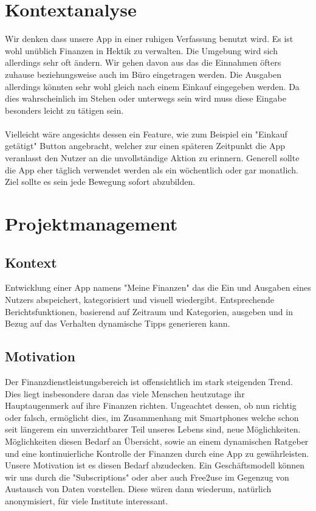 \documentclass[runningheads,a4paper]{llncs}
\begin{document}
\section{Kontextanalyse}

Wir denken dass unsere App in einer ruhigen Verfassung benutzt wird. Es ist wohl unüblich Finanzen in Hektik zu verwalten. Die Umgebung wird sich allerdings sehr oft ändern. Wir gehen davon aus das die Einnahmen öfters zuhause beziehungsweise auch im Büro eingetragen werden. Die Ausgaben allerdings könnten sehr wohl gleich nach einem Einkauf eingegeben werden. Da dies wahrscheinlich im Stehen oder unterwegs sein wird muss diese Eingabe besonders leicht zu tätigen sein. \\\\Vielleicht wäre angesichts dessen ein Feature, wie zum Beispiel ein "Einkauf getätigt" Button angebracht, welcher zur einen späteren Zeitpunkt die App veranlasst den Nutzer an die unvollständige Aktion zu erinnern. Generell sollte die App eher täglich verwendet werden als ein wöchentlich oder gar monatlich. Ziel sollte es sein jede Bewegung sofort abzubilden. 


\section{Projektmanagement}
\subsection{Kontext}
Entwicklung einer App namens "Meine Finanzen" das die Ein und Ausgaben eines Nutzers abspeichert, kategorisiert und visuell wiedergibt. Entsprechende Berichtsfunktionen, basierend auf Zeitraum und Kategorien, ausgeben und in Bezug auf das Verhalten dynamische Tipps generieren kann.

\subsection{Motivation}
Der Finanzdienstleistungsbereich ist offensichtlich im stark steigenden Trend. Dies liegt insbesondere daran das viele Menschen heutzutage ihr Hauptaugenmerk auf ihre Finanzen richten. Ungeachtet dessen, ob nun richtig oder falsch, ermöglicht dies, im Zusammenhang mit Smartphones welche schon seit längerem ein unverzichtbarer Teil unseres Lebens sind, neue Möglichkeiten. Möglichkeiten diesen Bedarf an Übersicht, sowie an einem dynamischen Ratgeber und eine kontinuierliche Kontrolle der Finanzen durch eine App zu gewährleisten.\\ Unsere Motivation ist es diesen Bedarf abzudecken. Ein Geschäftsmodell können wir uns durch die "Subscriptions"  oder aber auch Free2use im Gegenzug von Austausch von Daten vorstellen. Diese wären dann wiederum, natürlich anonymisiert, für viele Institute interessant. 
\end{document}
